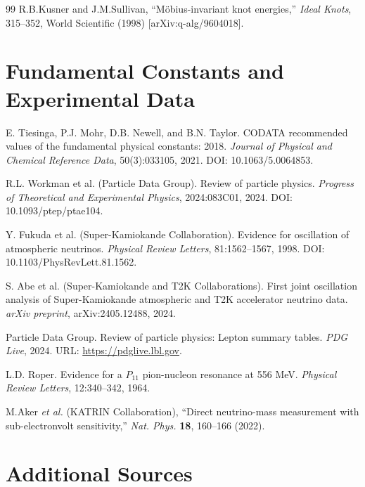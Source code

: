 \documentclass[11pt,a4paper]{article}
\begin{document}
\begin{thebibliography}{99}
		 R.B.Kusner and J.M.Sullivan, ``Möbius-invariant knot energies,''
		\textit{Ideal Knots}, 315--352, World Scientific (1998) [arXiv:q-alg/9604018].
		
		\section*{Fundamental Constants and Experimental Data}
		
		E. Tiesinga, P.J. Mohr, D.B. Newell, and B.N. Taylor.
		\newblock CODATA recommended values of the fundamental physical constants: 2018.
		\newblock \textit{Journal of Physical and Chemical Reference Data}, 50(3):033105, 2021.
		\newblock DOI: 10.1063/5.0064853.
		
		R.L. Workman et al. (Particle Data Group).
		\newblock Review of particle physics.
		\newblock \textit{Progress of Theoretical and Experimental Physics}, 2024:083C01, 2024.
		\newblock DOI: 10.1093/ptep/ptae104.
		
		Y. Fukuda et al. (Super-Kamiokande Collaboration).
		\newblock Evidence for oscillation of atmospheric neutrinos.
		\newblock \textit{Physical Review Letters}, 81:1562--1567, 1998.
		\newblock DOI: 10.1103/PhysRevLett.81.1562.
		
		S. Abe et al. (Super-Kamiokande and T2K Collaborations).
		\newblock First joint oscillation analysis of Super-Kamiokande atmospheric and T2K accelerator neutrino data.
		\newblock \textit{arXiv preprint}, arXiv:2405.12488, 2024.
		
		Particle Data Group.
		 Review of particle physics: Lepton summary tables.
		\newblock \textit{PDG Live}, 2024.
		\newblock URL: \url{https://pdglive.lbl.gov}.
		
		L.D. Roper.
		\newblock Evidence for a $P_{11}$ pion-nucleon resonance at 556 MeV.
		\newblock \textit{Physical Review Letters}, 12:340--342, 1964.
		
		M.Aker \textit{et al.} (KATRIN Collaboration), ``Direct neutrino-mass measurement with sub-electronvolt sensitivity,'' \textit{Nat. Phys.} \textbf{18}, 160--166 (2022).
		
		\section*{Additional Sources}
		

\end{thebibliography}
\end{document}
